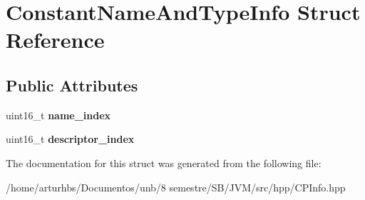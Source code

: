 \hypertarget{structConstantNameAndTypeInfo}{}\section{Constant\+Name\+And\+Type\+Info Struct Reference}
\label{structConstantNameAndTypeInfo}
\subsection*{Public Attributes}
\begin{DoxyCompactItemize}
\item 
uint16\+\_\+t {\bfseries name\+\_\+index}\hypertarget{structConstantNameAndTypeInfo_af856420a7554c2bcb679e5f63c2d7a56}{}\label{structConstantNameAndTypeInfo_af856420a7554c2bcb679e5f63c2d7a56}

\item 
uint16\+\_\+t {\bfseries descriptor\+\_\+index}\hypertarget{structConstantNameAndTypeInfo_a6e0af83874d65183ffc9dfd501f3ef44}{}\label{structConstantNameAndTypeInfo_a6e0af83874d65183ffc9dfd501f3ef44}

\end{DoxyCompactItemize}


The documentation for this struct was generated from the following file\+:\begin{DoxyCompactItemize}
\item 
/home/arturhbs/\+Documentos/unb/8 semestre/\+S\+B/\+J\+V\+M/src/hpp/C\+P\+Info.\+hpp\end{DoxyCompactItemize}
